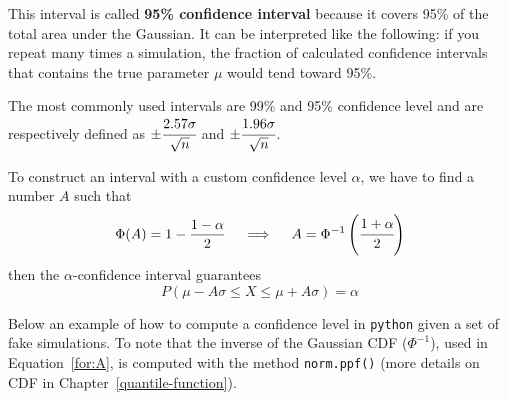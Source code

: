 This interval is called \textbf{95\% confidence interval} because
it covers 95\% of the total area under the Gaussian. It can be
interpreted like the following: if you repeat many times a simulation, 
the fraction of calculated confidence intervals that contains the true
parameter $\mu$ would tend toward 95\%.

The most commonly used intervals are 99\% and 95\% confidence level and are
respectively defined as \(\pm \cfrac{2.57\sigma}{\sqrt{n}}\) and
\(\pm \cfrac{1.96\sigma}{\sqrt{n}}\).

To construct an interval with a custom confidence level $\alpha$, we have to find a number $A$ such that
\begin{equation}
\Phi(A) = 1 - \frac{1-\alpha}{2}\quad\implies\quad A = \Phi^{-1}\left(\cfrac{1+\alpha}{2}\right)
\label{for:A}
\end{equation}
then the $\alpha$-confidence interval guarantees
\begin{equation}
P(\mu - A\sigma \le X \le \mu+ A\sigma) = \alpha 
\end{equation}

Below an example of how to compute a confidence level in \texttt{python} given a set of fake simulations. To note that the inverse of the Gaussian CDF ($\Phi^{-1}$), used in Equation~\ref{for:A}, is computed with the method \texttt{norm.ppf()} (more details on CDF in Chapter~\ref{quantile-function}).

